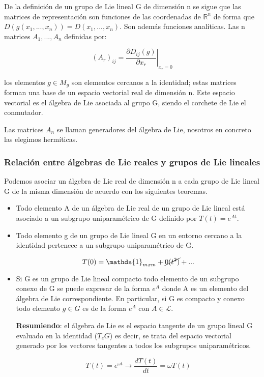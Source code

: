 De la definición de un grupo de Lie lineal G de dimensión n se sigue que las matrices de representación son funciones de las coordenadas de $\mathds{R}^n$ de forma que $D(g(x_1,...,x_n))=D(x_1,...,x_n)$. Son además funciones analíticas. Las n matrices $A_1,..., A_n$ definidas por:

$$\left . (A_r)_{ij}=\frac{\partial D_{ij}(g)}{\partial x_r} \right |_{x_r=0}$$

los elementos $g\in M_g$ son elementos cercanos a la identidad; estas matrices forman una base de un espacio vectorial real de dimensión n. Este espacio vectorial es el álgebra de Lie asociada al grupo G, siendo el corchete de Lie el conmutador.

Las matrices $A_n$ se llaman generadores del álgebra de Lie, nosotros en concreto las elegimos hermíticas.


\subsubsection{Relación entre álgebras de Lie reales y grupos de Lie lineales}

Podemos asociar un álgebra de Lie real de dimensión n a cada grupo de Lie lineal G de la misma dimensión de acuerdo con los siguientes teoremas.

\begin{itemize}
\item Todo elemento A de un álgebra de Lie real de un grupo de Lie lineal está asociado a un subgrupo uniparamétrico de G definido por $T(t)=e^{At}$.

\item Todo elemento g de un grupo de Lie lineal G en un entorno cercano a la identidad pertenece a un subgrupo uniparamétrico de G.

$$T(0)=\mathds{1}_{mxm}+\cancel{0(t^2)}+...$$

\item Si G es un grupo de Lie lineal compacto todo elemento de un subgrupo conexo de G se puede expresar de la forma $e^A$ donde A es un elemento del álgebra de Lie correspondiente. En particular, si G es compacto y conexo todo elemento $g\in G$ es de la forma $e^A$ con $A\in  \mathcal{L}$.

\textbf{Resumiendo}: el álgebra de Lie es el espacio tangente de un grupo lineal G evaluado en la identidad ($T_eG$) es decir, se trata del espacio vectorial generado por los vectores tangentes a todos los subgrupos uniparamétricos.

$$T(t)=e^{\omega t} \longrightarrow \frac{dT(t)}{dt}=\omega T(t)$$

\end{itemize}

